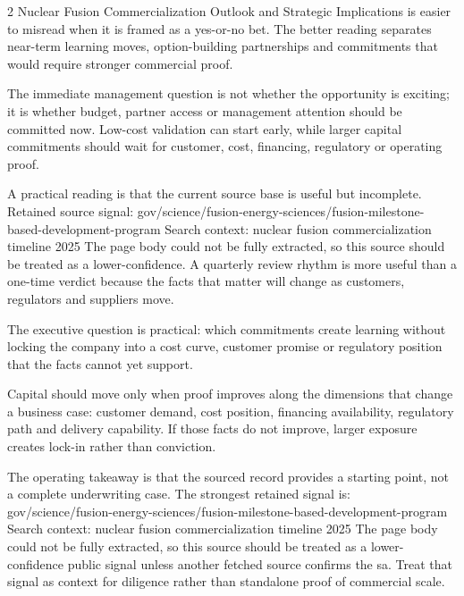 \documentclass[10pt,a4paper]{article}
\begin{document}
\begin{multicols}{2}
{\small Nuclear Fusion Commercialization Outlook and Strategic Implications is easier to misread when it is framed as a yes-or-no bet. The better reading separates near-term learning moves, option-building partnerships and commitments that would require stronger commercial proof.}\par
{\small The immediate management question is not whether the opportunity is exciting; it is whether budget, partner access or management attention should be committed now. Low-cost validation can start early, while larger capital commitments should wait for customer, cost, financing, regulatory or operating proof.}\par
{\small A practical reading is that the current source base is useful but incomplete. Retained source signal: gov/science/fusion-energy-sciences/fusion-milestone-based-development-program Search context: nuclear fusion commercialization timeline 2025 The page body could not be fully extracted, so this source should be treated as a lower-confidence. A quarterly review rhythm is more useful than a one-time verdict because the facts that matter will change as customers, regulators and suppliers move.}\par
{\small The executive question is practical: which commitments create learning without locking the company into a cost curve, customer promise or regulatory position that the facts cannot yet support.}\par
{\small Capital should move only when proof improves along the dimensions that change a business case: customer demand, cost position, financing availability, regulatory path and delivery capability. If those facts do not improve, larger exposure creates lock-in rather than conviction.}\par
{\small The operating takeaway is that the sourced record provides a starting point, not a complete underwriting case. The strongest retained signal is: gov/science/fusion-energy-sciences/fusion-milestone-based-development-program Search context: nuclear fusion commercialization timeline 2025 The page body could not be fully extracted, so this source should be treated as a lower-confidence public signal unless another fetched source confirms the sa. Treat that signal as context for diligence rather than standalone proof of commercial scale.}\par
\end{multicols}
\label{chap:7:end}
\end{document}

